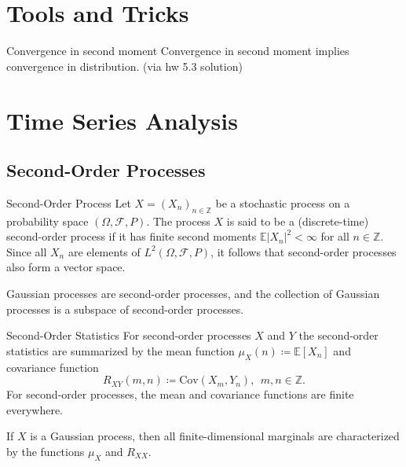 \documentclass{article}
\begin{document}

\tableofcontents

\newpage

\section{Tools and Tricks}

\begin{rmk}{Convergence in second moment }{}
Convergence in second moment implies convergence in distribution. 
(via hw 5.3 solution)
\end{rmk}

\newpage

\section{Time Series Analysis}

\subsection{Second-Order Processes}

\begin{defn}{Second-Order Process}{}
    Let \( X = (X_{n} )_{n\in \mathbb{Z} } \) be a stochastic process on a probability space \( (\Omega ,\mathcal{F},P) \). The process \( X \) is said to be a (discrete-time) second-order process if it has finite second moments \( \mathbb{E} |X_{n} |^{2} < \infty  \) for all \( n \in \mathbb{Z}  \). Since all \( X_{n}  \) are elements of \( L^2(\Omega ,\mathcal{F} ,P) \), it follows that second-order processes also form a vector space. 
\end{defn}

\begin{exmp}{}{}
    Gaussian processes are second-order processes, and the collection of Gaussian processes is a subspace of second-order processes.
\end{exmp}

\begin{defn}{Second-Order Statistics}{}
For second-order processes \( X \) and \( Y \) the second-order statistics are summarized by the mean function \( \mu _{X} (n) \coloneqq \mathbb{E} [X_{n} ] \) and covariance function
\[
    R_{XY} (m,n) \coloneqq \mathrm{Cov} (X_{m} ,Y_{n} ), \ \ m,n \in \mathbb{Z} .
\]
For second-order processes, the mean and covariance functions are finite everywhere.
\end{defn}
\begin{exmp}{}{}
    If $X$ is a Gaussian process, then all finite-dimensional marginals
    are characterized by the functions $\mu_ X$ and $R_{XX} $.
\end{exmp}
\end{document}
